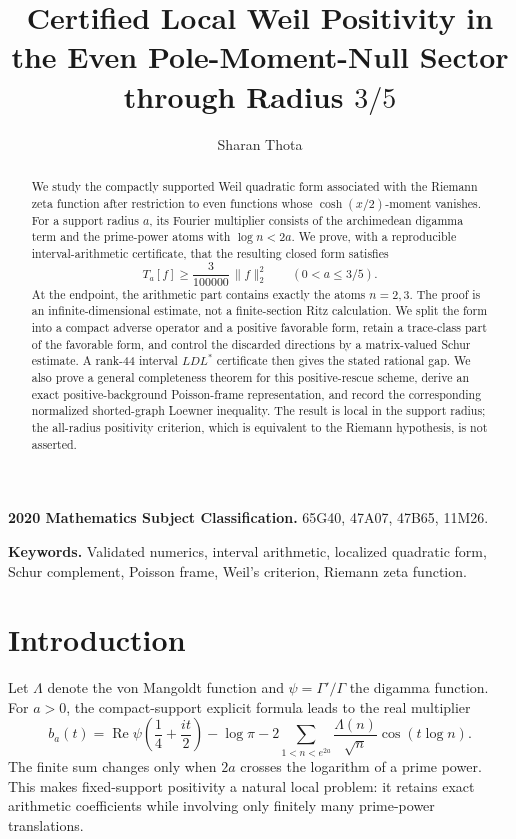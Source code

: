 \documentclass[11pt]{article}
\theoremstyle{remark}
\begin{document}
\title{Certified Local Weil Positivity in the Even Pole-Moment-Null
Sector through Radius \(3/5\)}
\author{Sharan Thota}
\date{}

\maketitle

\begin{abstract}
We study the compactly supported Weil quadratic form associated with the Riemann zeta function after restriction to even functions whose \(\cosh(x/2)\)-moment vanishes.
For a support radius \(a\), its Fourier multiplier consists of the archimedean digamma term and the prime-power atoms with \(\log n<2a\).
We prove, with a reproducible interval-arithmetic certificate,
that the resulting closed form satisfies
\[
        T_a[f]\geq \frac{3}{100000}\,\lVert f\rVert_2^2
        \qquad (0<a\leq 3/5).
\]
At the endpoint, the arithmetic part contains exactly the atoms \(n=2,3\).
The proof is an infinite-dimensional estimate, not a finite-section Ritz calculation.
We split the form into a compact adverse operator and a positive favorable form,
retain a trace-class part of the favorable form,
and control the discarded directions by a matrix-valued Schur estimate.
A rank-44 interval \(LDL^{*}\) certificate then gives the stated rational gap.
We also prove a general completeness theorem for this positive-rescue scheme,
derive an exact positive-background Poisson-frame representation,
and record the corresponding normalized shorted-graph Loewner inequality.
The result is local in the support radius; the all-radius positivity criterion,
which is equivalent to the Riemann hypothesis, is not asserted.
\end{abstract}

\medskip
\noindent\textbf{2020 Mathematics Subject Classification.} 65G40, 47A07, 47B65, 11M26.

\smallskip
\noindent\textbf{Keywords.} Validated numerics, interval arithmetic,
localized quadratic form, Schur complement, Poisson frame,
Weil's criterion, Riemann zeta function.

\section{Introduction}
\label{pub-sec-introduction}

Let \(\Lambda\) denote the von Mangoldt function and \(\psi=\Gamma'/\Gamma\) the digamma function.
For \(a>0\), the compact-support explicit formula leads to the real multiplier
\begin{equation}
 b_a(t)=
 \operatorname{Re}\psi\!\left(\frac14+\frac{it}{2}\right)-\log\pi
 -2\sum_{1<n<e^{2a}}\frac{\Lambda(n)}{\sqrt n}
       \cos(t\log n).
 \label{pub-eq-symbol-intro}
\end{equation}
The finite sum changes only when \(2a\) crosses the logarithm of a prime power.
This makes fixed-support positivity a natural local problem:
it retains exact arithmetic coefficients while involving only finitely many prime-power translations.
\end{document}
